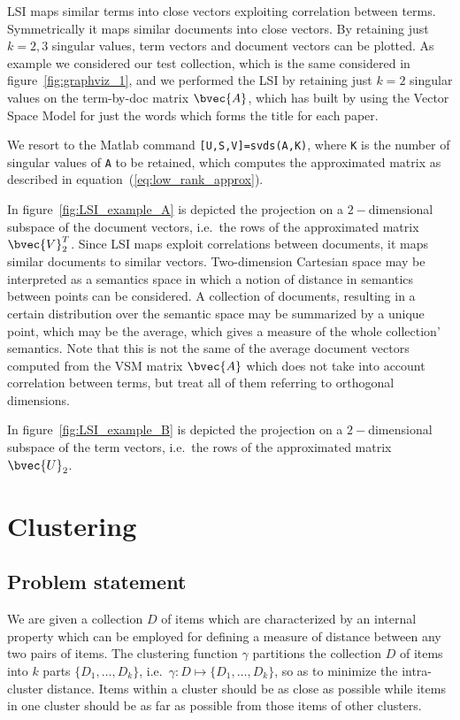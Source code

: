 LSI maps similar terms into close vectors exploiting correlation between terms. Symmetrically it maps similar documents into close vectors. By retaining just $k=2,3$ singular values, term vectors and document vectors can be plotted. As example we considered our test collection, which is the same considered in figure~\ref{fig:graphviz_1}, and we performed the LSI by retaining just $k=2$ singular values on the term-by-doc matrix $\bvec{A}$, which has built by using the Vector Space Model for just the words which forms the title for each paper.

We resort to the Matlab command \texttt{[U,S,V]=svds(A,K)}, where \texttt{K} is the number of singular values of \texttt{A} to be retained, which computes the approximated matrix as described in equation~(\ref{eq:low_rank_approx}).

In figure~\ref{fig:LSI_example_A} is depicted the projection on a $2-$dimensional subspace of the document vectors, i.e.\ the rows of the approximated matrix $\bvec{V}_2^T$. Since LSI maps exploit correlations between documents, it maps similar documents to similar vectors. Two-dimension Cartesian space may be interpreted as a semantics space in which a notion of distance in semantics between points can be considered. A collection of documents, resulting in a certain distribution over the semantic space may be summarized by a unique point, which may be the average, which gives a measure of the whole collection' semantics. Note that this is not the same of the average document vectors computed from the VSM matrix $\bvec{A}$ which does not take into account correlation between terms, but treat all of them referring to orthogonal dimensions.

In figure~\ref{fig:LSI_example_B} is depicted the projection on a $2-$dimensional subspace of the term vectors, i.e.\ the rows of the approximated matrix $\bvec{U}_2$. 

\section{\label{sec:clustering}Clustering}

\subsection{Problem statement}
We are given a collection $D$ of items which are characterized by an internal property which can be employed for defining a measure of distance between any two pairs of items. The clustering function $\gamma$ partitions the collection $D$ of items into $k$ parts $\{D_1, \ldots, D_k\}$, i.e.\ $\gamma : D \mapsto \{D_1, \ldots, D_k\}$, so as to minimize the intra-cluster distance. Items within a cluster should be as close as possible while items in one cluster should be as far as possible from those items of other clusters.

